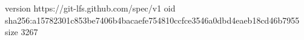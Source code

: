 version https://git-lfs.github.com/spec/v1
oid sha256:a15782301c853be7406b4bacaefe754810ccfce3546a0dbd4eaeb18cd46b7955
size 3267

